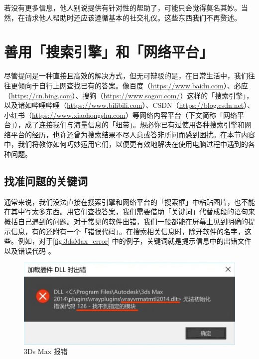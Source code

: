 若没有更多信息，他人别说提供有针对性的帮助了，可能只会觉得莫名其妙。当然，在请求他人帮助时还应该遵循基本的社交礼仪。这些东西我们不再赘述。

\section{善用「搜索引擎」和「网络平台」}

尽管提问是一种直接且高效的解决方式，但无可辩驳的是，在日常生活中，我们往往更倾向于自行上网查找已有的答案。像百度（\url{https://www.baidu.com}）、必应（\url{https://cn.bing.com}）、搜狗（\url{https://www.sogou.com/}）这样的「搜索引擎」，以及诸如哔哩哔哩（\url{https://www.bilibili.com}）、CSDN（\url{https://blog.csdn.net}）、小红书（\url{https://www.xiaohongshu.com}）等网络内容平台（下文简称「网络平台」），成了连接我们与海量信息的「纽带」。想必你已有过使用各种搜索引擎和网络平台的经历，也许还曾为搜索结果不尽人意或答非所问而感到困扰。在本节内容中，我们将教你如何巧妙运用它们，以便更有效地解决在使用电脑过程中遇到的各种问题。

\subsection{找准问题的关键词}

通常来说，我们没法直接在搜索引擎和网络平台的「搜索框」中粘贴图片，也不能在其中写太多东西。用它们查找答案，我们需要借助「关键词」代替成段的语句来概括自己遇到的问题。对于常见的软件出错，我们一般都能在屏幕上见到明确的提示信息，有的还附有一个「错误代码」。在搜索相关信息时，除开软件的名字，这些。例如，对于\autoref{fig:3dsMax_error} 中的例子，关键词就是提示信息中的出错文件  以及错误代码 。

\begin{figure}[htb!]
  \centering
  \includegraphics[width=.85\textwidth]{assets/basic/3dsMax_error.png}
  \caption{3Ds Max 报错}
  \label{fig:3dsMax_error}
\end{figure}

